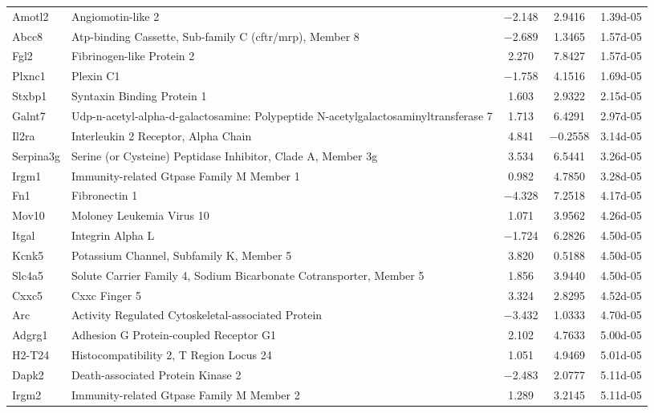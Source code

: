 {\begin{longtable}[l]{p{2.5cm}p{6.6cm}ccc}
Amotl2	& Angiomotin-like 2	& \num{-2.148}	& \num{ 2.9416}	& \num{1.39d-05}\\ 
Abcc8	& Atp-binding Cassette, Sub-family C (cftr/mrp), Member 8	& \num{-2.689}	& \num{ 1.3465}	& \num{1.57d-05}\\ 
Fgl2	& Fibrinogen-like Protein 2	& \num{ 2.270}	& \num{ 7.8427}	& \num{1.57d-05}\\ 
Plxnc1	& Plexin C1	& \num{-1.758}	& \num{ 4.1516}	& \num{1.69d-05}\\ 
Stxbp1	& Syntaxin Binding Protein 1	& \num{ 1.603}	& \num{ 2.9322}	& \num{2.15d-05}\\ 
Galnt7	& Udp-n-acetyl-alpha-d-galactosamine: Polypeptide N-acetylgalactosaminyltransferase 7	& \num{ 1.713}	& \num{ 6.4291}	& \num{2.97d-05}\\ 
Il2ra	& Interleukin 2 Receptor, Alpha Chain	& \num{ 4.841}	& \num{-0.2558}	& \num{3.14d-05}\\ 
Serpina3g	& Serine (or Cysteine) Peptidase Inhibitor, Clade A, Member 3g	& \num{ 3.534}	& \num{ 6.5441}	& \num{3.26d-05}\\ 
Irgm1	& Immunity-related Gtpase Family M Member 1	& \num{ 0.982}	& \num{ 4.7850}	& \num{3.28d-05}\\ 
Fn1	& Fibronectin 1	& \num{-4.328}	& \num{ 7.2518}	& \num{4.17d-05}\\ 
Mov10	& Moloney Leukemia Virus 10	& \num{ 1.071}	& \num{ 3.9562}	& \num{4.26d-05}\\ 
Itgal	& Integrin Alpha L	& \num{-1.724}	& \num{ 6.2826}	& \num{4.50d-05}\\ 
Kcnk5	& Potassium Channel, Subfamily K, Member 5	& \num{ 3.820}	& \num{ 0.5188}	& \num{4.50d-05}\\ 
Slc4a5	& Solute Carrier Family 4, Sodium Bicarbonate Cotransporter, Member 5	& \num{ 1.856}	& \num{ 3.9440}	& \num{4.50d-05}\\ 
Cxxc5	& Cxxc Finger 5	& \num{ 3.324}	& \num{ 2.8295}	& \num{4.52d-05}\\ 
Arc	& Activity Regulated Cytoskeletal-associated Protein	& \num{-3.432}	& \num{ 1.0333}	& \num{4.70d-05}\\ 
Adgrg1	& Adhesion G Protein-coupled Receptor G1	& \num{ 2.102}	& \num{ 4.7633}	& \num{5.00d-05}\\ 
H2-T24	& Histocompatibility 2, T Region Locus 24	& \num{ 1.051}	& \num{ 4.9469}	& \num{5.01d-05}\\ 
Dapk2	& Death-associated Protein Kinase 2	& \num{-2.483}	& \num{ 2.0777}	& \num{5.11d-05}\\ 
Irgm2	& Immunity-related Gtpase Family M Member 2	& \num{ 1.289}	& \num{ 3.2145}	& \num{5.11d-05}\\ 

\end{longtable}}
